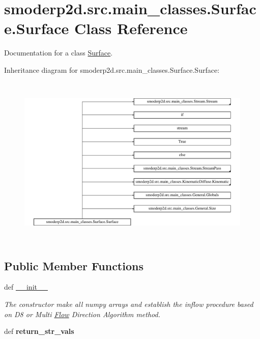 \hypertarget{classsmoderp2d_1_1src_1_1main__classes_1_1Surface_1_1Surface}{\section{smoderp2d.\-src.\-main\-\_\-classes.\-Surface.\-Surface Class Reference}
\label{classsmoderp2d_1_1src_1_1main__classes_1_1Surface_1_1Surface}
}


Documentation for a class \hyperlink{classsmoderp2d_1_1src_1_1main__classes_1_1Surface_1_1Surface}{Surface}.  


Inheritance diagram for smoderp2d.\-src.\-main\-\_\-classes.\-Surface.\-Surface\-:\begin{figure}[H]
\begin{center}
\leavevmode
\includegraphics[height=8.259586cm]{d0/d80/classsmoderp2d_1_1src_1_1main__classes_1_1Surface_1_1Surface}
\end{center}
\end{figure}
\subsection*{Public Member Functions}
\begin{DoxyCompactItemize}
\item 
\hypertarget{classsmoderp2d_1_1src_1_1main__classes_1_1Surface_1_1Surface_aec5b45550f4b30c9d06d3b29929b8762}{def \hyperlink{classsmoderp2d_1_1src_1_1main__classes_1_1Surface_1_1Surface_aec5b45550f4b30c9d06d3b29929b8762}{\-\_\-\-\_\-init\-\_\-\-\_\-}}\label{classsmoderp2d_1_1src_1_1main__classes_1_1Surface_1_1Surface_aec5b45550f4b30c9d06d3b29929b8762}

\begin{DoxyCompactList}\small\item\em The constructor make all numpy arrays and establish the inflow procedure based on D8 or Multi \hyperlink{namespacesmoderp2d_1_1src_1_1main__classes_1_1Flow}{Flow} Direction Algorithm method. \end{DoxyCompactList}\item 
\hypertarget{classsmoderp2d_1_1src_1_1main__classes_1_1Surface_1_1Surface_aaef794fb6ee3d7681d62cc084c7193bd}{def {\bfseries return\-\_\-str\-\_\-vals}}\label{classsmoderp2d_1_1src_1_1main__classes_1_1Surface_1_1Surface_aaef794fb6ee3d7681d62cc084c7193bd}

\end{DoxyCompactItemize}
